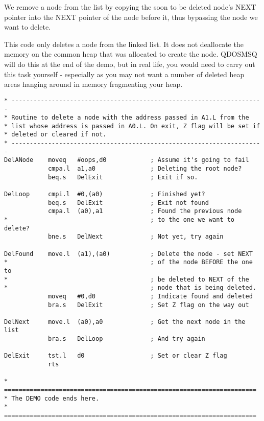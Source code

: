 We remove a node from the list by copying the soon to be deleted
    node's NEXT pointer into the NEXT pointer of the node before it, thus
    bypassing the node we want to delete.

\begin{warning}
This code only deletes a node from the linked list. It does not
      deallocate the memory on the common heap that was allocated to create
      the node. QDOSMSQ will do this at the end of the demo, but in real life,
      you would need to carry out this task yourself -{} especially as you may
      not want a number of deleted heap areas hanging around in memory
      fragmenting your heap.
\end{warning}

\begin{lstlisting}[firstnumber=last,caption={Single Linked List - Demo Code - Deleting A Node}]
* ---------------------------------------------------------------------
* Routine to delete a node with the address passed in A1.L from the 
* list whose address is passed in A0.L. On exit, Z flag will be set if 
* deleted or cleared if not.
* ---------------------------------------------------------------------
DelANode    moveq   #oops,d0            ; Assume it's going to fail
            cmpa.l  a1,a0               ; Deleting the root node?
            beq.s   DelExit             ; Exit if so.

DelLoop     cmpi.l  #0,(a0)             ; Finished yet?
            beq.s   DelExit             ; Exit not found
            cmpa.l  (a0),a1             ; Found the previous node
*                                       ; to the one we want to delete?
            bne.s   DelNext             ; Not yet, try again

DelFound    move.l  (a1),(a0)           ; Delete the node - set NEXT
*                                       ; of the node BEFORE the one to
*                                       ; be deleted to NEXT of the
*                                       ; node that is being deleted.
            moveq   #0,d0               ; Indicate found and deleted
            bra.s   DelExit             ; Set Z flag on the way out

DelNext     move.l  (a0),a0             ; Get the next node in the list
            bra.s   DelLoop             ; And try again

DelExit     tst.l   d0                  ; Set or clear Z flag
            rts

* =====================================================================
* The DEMO code ends here.
* =====================================================================
\end{lstlisting}

